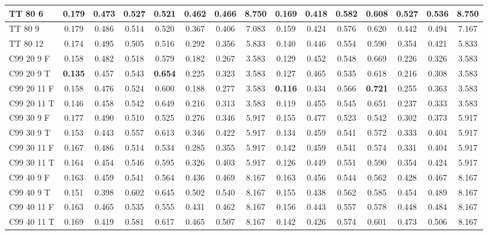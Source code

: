 \documentclass{article}
\begin{document}
\begin{longtable}[c]{|l|c|c|c|c|c|c|c||c|c|c|c|c|c|c|}
TT 80  6 & 0.179 & 0.473 & 0.527 & 0.521 & 0.462 & 0.466 & 8.750 & 0.169 & 0.418 & 0.582 & 0.608 & 0.527 & 0.536 & 8.750\\ \hline
TT 80  9 & 0.179 & 0.486 & 0.514 & 0.520 & 0.367 & 0.406 & 7.083 & 0.159 & 0.424 & 0.576 & 0.620 & 0.442 & 0.494 & 7.167\\ \hline
TT 80 12 & 0.174 & 0.495 & 0.505 & 0.516 & 0.292 & 0.356 & 5.833 & 0.140 & 0.446 & 0.554 & 0.590 & 0.354 & 0.421 & 5.833\\ \hline\hline
C99 20  9 F & 0.158 & 0.482 & 0.518 & 0.579 & 0.182 & 0.267 & 3.583 & 0.129 & 0.452 & 0.548 & 0.669 & 0.226 & 0.326 & 3.583\\ \hline
C99 20  9 T & \textbf{0.135} & 0.457 & 0.543 & \textbf{0.654} & 0.225 & 0.323 & 3.583 & 0.127 & 0.465 & 0.535 & 0.618 & 0.216 & 0.308 & 3.583\\ \hline
C99 20 11 F & 0.158 & 0.476 & 0.524 & 0.600 & 0.188 & 0.277 & 3.583 & \textbf{0.116} & 0.434 & 0.566 & \textbf{0.721} & 0.255 & 0.363 & 3.583\\ \hline
C99 20 11 T & 0.146 & 0.458 & 0.542 & 0.649 & 0.216 & 0.313 & 3.583 & 0.119 & 0.455 & 0.545 & 0.651 & 0.237 & 0.333 & 3.583\\ \hline
C99 30  9 F & 0.177 & 0.490 & 0.510 & 0.525 & 0.276 & 0.346 & 5.917 & 0.155 & 0.477 & 0.523 & 0.542 & 0.302 & 0.373 & 5.917\\ \hline
C99 30  9 T & 0.153 & 0.443 & 0.557 & 0.613 & 0.346 & 0.422 & 5.917 & 0.134 & 0.459 & 0.541 & 0.572 & 0.333 & 0.404 & 5.917\\ \hline
C99 30 11 F & 0.167 & 0.486 & 0.514 & 0.534 & 0.285 & 0.355 & 5.917 & 0.142 & 0.459 & 0.541 & 0.574 & 0.331 & 0.404 & 5.917\\ \hline
C99 30 11 T & 0.164 & 0.454 & 0.546 & 0.595 & 0.326 & 0.403 & 5.917 & 0.126 & 0.449 & 0.551 & 0.590 & 0.354 & 0.424 & 5.917\\ \hline
C99 40  9 F & 0.163 & 0.459 & 0.541 & 0.564 & 0.436 & 0.469 & 8.167 & 0.163 & 0.456 & 0.544 & 0.562 & 0.428 & 0.467 & 8.167\\ \hline
C99 40  9 T & 0.151 & 0.398 & 0.602 & 0.645 & 0.502 & 0.540 & 8.167 & 0.155 & 0.438 & 0.562 & 0.585 & 0.454 & 0.489 & 8.167\\ \hline
C99 40 11 F & 0.163 & 0.465 & 0.535 & 0.555 & 0.431 & 0.462 & 8.167 & 0.156 & 0.443 & 0.557 & 0.578 & 0.448 & 0.484 & 8.167\\ \hline
C99 40 11 T & 0.169 & 0.419 & 0.581 & 0.617 & 0.465 & 0.507 & 8.167 & 0.142 & 0.426 & 0.574 & 0.601 & 0.473 & 0.506 & 8.167\\ \hline

\end{longtable}
\end{document}
